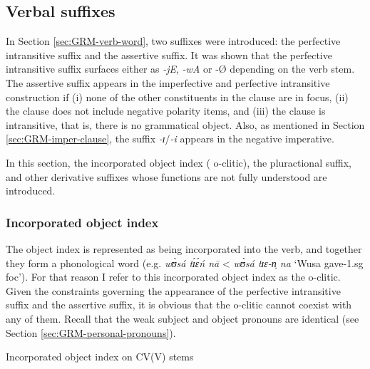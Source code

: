 \begin{exe}
\begin{exe}
\begin{exe}
{\begin{exe}
\begin{exe}
\begin{exe}
\begin{exe}
\begin{exe}
\begin{exe}
\begin{exe}
\begin{xlist}
\begin{exe}
\begin{exe}
\begin{exe}
\begin{exe}
\begin{exe}
\begin{exe}
\begin{exe}
\begin{exe}
\begin{exe}
\begin{exe}
\begin{exe}
\begin{exe}
\begin{exe}
\begin{exe}
\begin{exe}
\subsection{Verbal suffixes}
\label{sec:GRM-verb-suffix}


In Section \ref{sec:GRM-verb-word}, two suffixes were introduced: the 
perfective 
intransitive suffix and the assertive suffix. It was shown that the perfective 
intransitive suffix surfaces either as {\it -jE}, {\it -wA} or {-\O} depending 
on  the verb stem.  The assertive suffix appears  in the imperfective and 
perfective  intransitive construction if  (i) none of the other constituents in 
the clause are in focus, (ii) the clause does not include negative polarity 
items, and (iii) the clause is intransitive, that is, there is no grammatical 
object. Also,  as mentioned in Section \ref{sec:GRM-imper-clause},  the suffix 
{\it -ɪ}/{\it -i} appears in the negative imperative. 

In this section,  the incorporated object index  ({\sc
o}-clitic), the pluractional  suffix, and  other derivative suffixes whose
functions are not fully understood are introduced.


\subsubsection{Incorporated object index}
\label{sec:GRM-morph-opro}


The object index  is represented as being incorporated into the verb,  and 
together they form a phonological word (e.g.  {\it wʊ̀sá tɪ́ɛ́ń nā} < {\it 
wʊ̀sá tɪɛ-n̩ na}  `Wusa gave-{\sc 1.sg} {\sc foc}').  For that reason I refer 
to this incorporated object index as the {\sc o}-clitic. Given the constraints 
governing the appearance of the perfective intransitive suffix and the assertive 
suffix, it is obvious that the {\sc o}-clitic cannot coexist with any of them. 
Recall that the  weak subject and object  pronouns are identical (see Section 
\ref{sec:GRM-personal-pronouns}).

\begin{table}[!htb]
\centering
\caption{Incorporated object index on  CV(V) stems\label{tab:object-clitic}}


\end{table}
\end{exe}
\end{exe}
\end{exe}
\end{exe}
\end{exe}
\end{exe}
\end{exe}
\end{exe}
\end{exe}
\end{exe}
\end{exe}
\end{exe}
\end{exe}
\end{exe}
\end{exe}
\end{xlist}
\end{exe}
\end{exe}
\end{exe}
\end{exe}
\end{exe}
\end{exe}
\end{exe}}
\end{exe}
\end{exe}
\end{exe}
